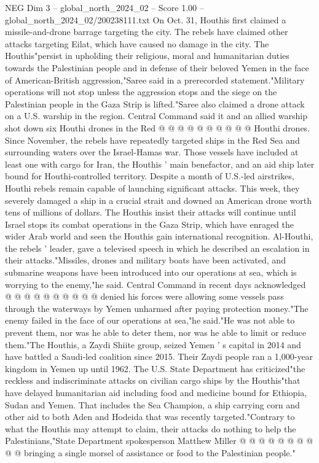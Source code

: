 \begin{textsample}{NEG Dim 3 – global\_north\_2024\_02 – Score 1.00 – global\_north\_2024\_02/200238111.txt}
On Oct. 31, Houthis first claimed a missile-and-drone barrage targeting the city.
The rebels have claimed other attacks targeting Eilat, which have caused no damage in the city.
The Houthis"persist in upholding their religious, moral and humanitarian duties towards the Palestinian people and in defense of their beloved Yemen in the face of American-British aggression,"Saree said in a prerecorded statement."Military operations will not stop unless the aggression stops and the siege on the Palestinian people in the Gaza Strip is lifted."Saree also claimed a drone attack on a U.S. warship in the region.
Central Command said it and an allied warship shot down six Houthi drones in the Red @ @ @ @ @ @ @ @ @ @ Houthi drones.
Since November, the rebels have repeatedly targeted ships in the Red Sea and surrounding waters over the Israel-Hamas war.
Those vessels have included at least one with cargo for Iran, the Houthis ' main benefactor, and an aid ship later bound for Houthi-controlled territory.
Despite a month of U.S.-led airstrikes, Houthi rebels remain capable of launching significant attacks.
This week, they severely damaged a ship in a crucial strait and downed an American drone worth tens of millions of dollars.
The Houthis insist their attacks will continue until Israel stops its combat operations in the Gaza Strip, which have enraged the wider Arab world and seen the Houthis gain international recognition.
Al-Houthi, the rebels ' leader, gave a televised speech in which he described an escalation in their attacks."Missiles, drones and military boats have been activated, and submarine weapons have been introduced into our operations at sea, which is worrying to the enemy,"he said.
Central Command in recent days acknowledged @ @ @ @ @ @ @ @ @ @ denied his forces were allowing some vessels pass through the waterways by Yemen unharmed after paying protection money."The enemy failed in the face of our operations at sea,"he said."He was not able to prevent them, nor was he able to deter them, nor was he able to limit or reduce them."The Houthis, a Zaydi Shiite group, seized Yemen ' s capital in 2014 and have battled a Saudi-led coalition since 2015.
Their Zaydi people ran a 1,000-year kingdom in Yemen up until 1962.
The U.S.
State Department has criticized"the reckless and indiscriminate attacks on civilian cargo ships by the Houthis"that have delayed humanitarian aid including food and medicine bound for Ethiopia, Sudan and Yemen.
That includes the Sea Champion, a ship carrying corn and other aid to both Aden and Hodeida that was recently targeted."Contrary to what the Houthis may attempt to claim, their attacks do nothing to help the Palestinians,"State Department spokesperson Matthew Miller @ @ @ @ @ @ @ @ @ @ bringing a single morsel of assistance or food to the Palestinian people."

\end{textsample}
